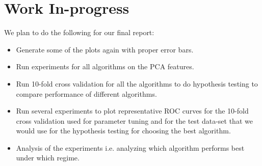 \documentclass[10pt]{scrartcl}
\begin{document}
\section*{Work In-progress}
We plan to do the following for our final report:
\begin{itemize}
\item Generate some of the plots again with proper error bars. 
\item Run experiments for all algorithms on the PCA features. 
\item Run 10-fold cross validation for all the algorithms to do hypothesis testing to compare performance of different algorithms.
\item Run several experiments to plot representative ROC curves for the 10-fold cross validation used for parameter tuning and for the test data-set that we would use for the hypothesis testing for choosing the best algorithm.


\item Analysis of the experiments i.e. analyzing which algorithm performs best under which regime.
\end{itemize} 
\end{document}
